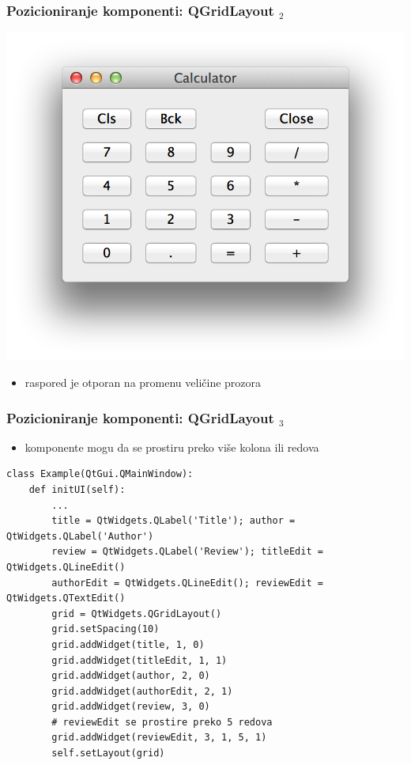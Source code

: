 \documentclass[utf8,compress,aspectratio=169]{beamer}
\begin{document}
\begin{frame}[fragile]
  \frametitle{Pozicioniranje komponenti: QGridLayout $_2$}
\begin{center}
\includegraphics[scale=0.5]{pyqt08.png}
\end{center}
  \begin{itemize}
    \item raspored je otporan na promenu veličine prozora
  \end{itemize}
\end{frame}

\begin{frame}[fragile,shrink=20]
  \frametitle{Pozicioniranje komponenti: QGridLayout $_3$}
  \begin{itemize}
    \item komponente mogu da se prostiru preko više kolona ili redova
  \end{itemize}
\begin{verbatim}
class Example(QtGui.QMainWindow):
    def initUI(self):
        ...
        title = QtWidgets.QLabel('Title'); author = QtWidgets.QLabel('Author')
        review = QtWidgets.QLabel('Review'); titleEdit = QtWidgets.QLineEdit()
        authorEdit = QtWidgets.QLineEdit(); reviewEdit = QtWidgets.QTextEdit()
        grid = QtWidgets.QGridLayout()
        grid.setSpacing(10)
        grid.addWidget(title, 1, 0)
        grid.addWidget(titleEdit, 1, 1)
        grid.addWidget(author, 2, 0)
        grid.addWidget(authorEdit, 2, 1)
        grid.addWidget(review, 3, 0)
        # reviewEdit se prostire preko 5 redova
        grid.addWidget(reviewEdit, 3, 1, 5, 1)
        self.setLayout(grid)
\end{verbatim}
\end{frame}
\end{document}
